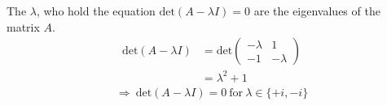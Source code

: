 {\color{solution}
The $\lambda$, who hold the equation $\text{det}(A-\lambda I)=0$ are the eigenvalues of the matrix $A$.
\begin{align*}
\text{det}(A-\lambda I)&=\text{det}\begin{pmatrix}-\lambda&1\\-1&-\lambda\end{pmatrix}\\ 
&=\lambda^2+1
\end{align*}
\begin{align*}
\Rightarrow~\text{det}(A-\lambda I)=0~\text{for}~\lambda\in\{+i,-i\}
\end{align*}
}